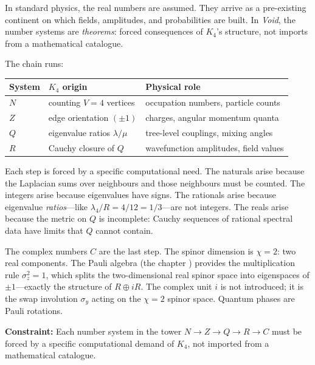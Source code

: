 \documentclass[11pt,a4paper]{book}
\def\mathbb#1{#1}%
\begin{document}
In standard physics, the real numbers are assumed. They arrive as a pre-existing continent on which fields, amplitudes, and probabilities are built. In \textit{Void}, the number systems are \emph{theorems}: forced consequences of $K_4$'s structure, not imports from a mathematical catalogue.

The chain runs:

\begin{center}
\begin{tabular}{lll}
\toprule
System & $K_4$ origin & Physical role \\
\midrule
$\mathbb{N}$ & counting $V = 4$ vertices & occupation numbers, particle counts \\
$\mathbb{Z}$ & edge orientation $(\pm 1)$ & charges, angular momentum quanta \\
$\mathbb{Q}$ & eigenvalue ratios $\lambda/\mu$ & tree-level couplings, mixing angles \\
$\mathbb{R}$ & Cauchy closure of $\mathbb{Q}$ & wavefunction amplitudes, field values \\
\bottomrule
\end{tabular}
\end{center}

Each step is forced by a specific computational need. The naturals arise because the Laplacian sums over neighbours and those neighbours must be counted. The integers arise because eigenvalues have signs. The rationals arise because eigenvalue \emph{ratios}---like $\lambda_4/R = 4/12 = 1/3$---are not integers. The reals arise because the metric on $\mathbb{Q}$ is incomplete: Cauchy sequences of rational spectral data have limits that $\mathbb{Q}$ cannot contain.

The complex numbers $\mathbb{C}$ are the last step. The spinor dimension is $\chi = 2$: two real components. The Pauli algebra (the chapter \emph{}) provides the multiplication rule $\sigma_z^2 = 1$, which splits the two-dimensional real spinor space into eigenspaces of $\pm 1$---exactly the structure of $\mathbb{R} \oplus i\mathbb{R}$. The complex unit $i$ is not introduced; it is the swap involution $\sigma_y$ acting on the $\chi = 2$ spinor space. Quantum phases are Pauli rotations.

\textbf{Constraint:} Each number system in the tower $\mathbb{N} \to \mathbb{Z} \to \mathbb{Q} \to \mathbb{R} \to \mathbb{C}$ must be forced by a specific computational demand of $K_4$, not imported from a mathematical catalogue.
\end{document}

